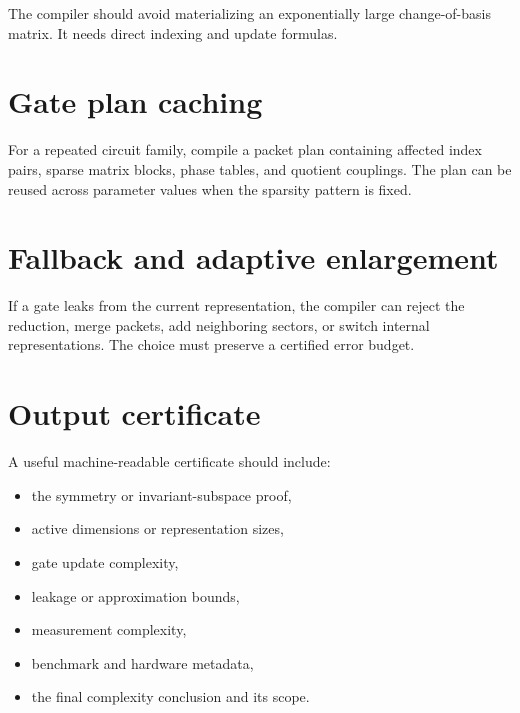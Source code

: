 The compiler should avoid materializing an exponentially large change-of-basis matrix. It needs direct indexing and update formulas.

\section{Gate plan caching}
For a repeated circuit family, compile a packet plan containing affected index pairs, sparse matrix blocks, phase tables, and quotient couplings. The plan can be reused across parameter values when the sparsity pattern is fixed.

\section{Fallback and adaptive enlargement}
If a gate leaks from the current representation, the compiler can reject the reduction, merge packets, add neighboring sectors, or switch internal representations. The choice must preserve a certified error budget.

\section{Output certificate}
A useful machine-readable certificate should include:

\begin{itemize}
\item the symmetry or invariant-subspace proof,
\item active dimensions or representation sizes,
\item gate update complexity,
\item leakage or approximation bounds,
\item measurement complexity,
\item benchmark and hardware metadata,
\item the final complexity conclusion and its scope.
\end{itemize}
